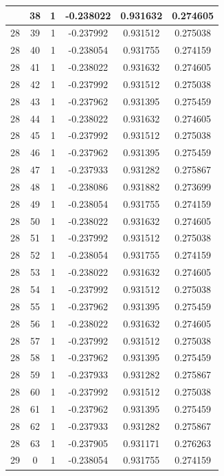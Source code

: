 \documentclass[12pt,a4paper]{article}
\numberwithin{equation}{section}
\numberwithin{figure}{section}
\numberwithin{table}{section}
\begin{document}
\begin{longtable}{|c|c|c|c|c|c|}
\pagebreak
28 & 38 & 1 & -0.238022 & 0.931632 & 0.274605 \\ \hline
28 & 39 & 1 & -0.237992 & 0.931512 & 0.275038 \\ \hline
28 & 40 & 1 & -0.238054 & 0.931755 & 0.274159 \\ \hline
28 & 41 & 1 & -0.238022 & 0.931632 & 0.274605 \\ \hline
28 & 42 & 1 & -0.237992 & 0.931512 & 0.275038 \\ \hline
28 & 43 & 1 & -0.237962 & 0.931395 & 0.275459 \\ \hline
28 & 44 & 1 & -0.238022 & 0.931632 & 0.274605 \\ \hline
28 & 45 & 1 & -0.237992 & 0.931512 & 0.275038 \\ \hline
28 & 46 & 1 & -0.237962 & 0.931395 & 0.275459 \\ \hline
28 & 47 & 1 & -0.237933 & 0.931282 & 0.275867 \\ \hline
28 & 48 & 1 & -0.238086 & 0.931882 & 0.273699 \\ \hline
28 & 49 & 1 & -0.238054 & 0.931755 & 0.274159 \\ \hline
28 & 50 & 1 & -0.238022 & 0.931632 & 0.274605 \\ \hline
28 & 51 & 1 & -0.237992 & 0.931512 & 0.275038 \\ \hline
28 & 52 & 1 & -0.238054 & 0.931755 & 0.274159 \\ \hline
28 & 53 & 1 & -0.238022 & 0.931632 & 0.274605 \\ \hline
28 & 54 & 1 & -0.237992 & 0.931512 & 0.275038 \\ \hline
28 & 55 & 1 & -0.237962 & 0.931395 & 0.275459 \\ \hline
28 & 56 & 1 & -0.238022 & 0.931632 & 0.274605 \\ \hline
28 & 57 & 1 & -0.237992 & 0.931512 & 0.275038 \\ \hline
28 & 58 & 1 & -0.237962 & 0.931395 & 0.275459 \\ \hline
28 & 59 & 1 & -0.237933 & 0.931282 & 0.275867 \\ \hline
28 & 60 & 1 & -0.237992 & 0.931512 & 0.275038 \\ \hline
28 & 61 & 1 & -0.237962 & 0.931395 & 0.275459 \\ \hline
28 & 62 & 1 & -0.237933 & 0.931282 & 0.275867 \\ \hline
28 & 63 & 1 & -0.237905 & 0.931171 & 0.276263 \\ \hline
29 & 0 & 1 & -0.238054 & 0.931755 & 0.274159 \\ \hline

\end{longtable}
\end{document}
